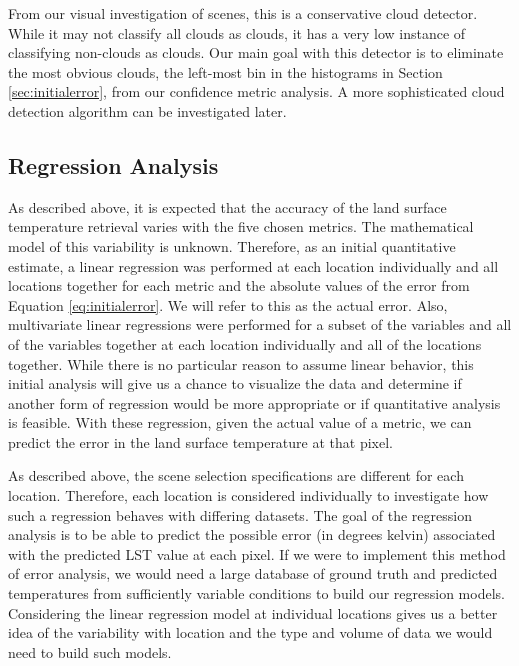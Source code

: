 \documentclass{book}
\begin{document}
From our visual investigation of scenes, this is a conservative cloud detector.  While it may not classify all clouds as clouds, it has a very low instance of classifying non-clouds as clouds.  Our main goal with this detector is to eliminate the most obvious clouds, the left-most bin in the histograms in Section \ref{sec:initialerror}, from our confidence metric analysis.  A more sophisticated cloud detection algorithm can be investigated later.

\subsection{Regression Analysis}
\label{sec:regression}

As described above, it is expected that the accuracy of the land surface temperature retrieval varies with the five chosen metrics.  The mathematical model of this variability is unknown.  Therefore, as an initial quantitative estimate, a linear regression was performed at each location individually and all locations together for each metric and the absolute values of the error from Equation \ref{eq:initialerror}.  We will refer to this as the actual error.  Also, multivariate linear regressions were performed for a subset of the variables and all of the variables together at each location individually and all of the locations together.  While there is no particular reason to assume linear behavior, this initial analysis will give us a chance to visualize the data and determine if another form of regression would be more appropriate or if quantitative analysis is feasible.  With these regression, given the actual value of a metric, we can predict the error in the land surface temperature at that pixel.  

As described above, the scene selection specifications are different for each location.  Therefore, each location is considered individually to investigate how such a regression behaves with differing datasets.  The goal of the regression analysis is to be able to predict the possible error (in degrees kelvin) associated with the predicted LST value at each pixel.  If we were to implement this method of error analysis, we would need a large database of ground truth and predicted temperatures from sufficiently variable conditions to build our regression models.  Considering the linear regression model at individual locations gives us a better idea of the variability with location and the type and volume of data we would need to build such models.
\end{document}
